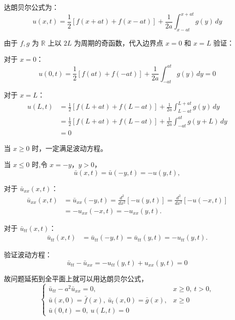 \documentclass[12pt,a4paper]{article}
\numberwithin{subsection}{section}   %
\numberwithin{subsubsection}{subsection}
\theoremstyle{plain}
\theoremstyle{definition}
\theoremstyle{remark}
\theoremstyle{remark}
\begin{document}
达朗贝尔公式为：
\begin{equation}
	u(x,t) = \frac{1}{2} \left[ f(x + at) + f(x - at) \right] + \frac{1}{2a} \int_{x - at}^{x + at} g(y) \, dy
\end{equation}

由于 \(f, g\) 为 \(\mathbb{R}\) 上以 \(2L\) 为周期的奇函数，代入边界点 \(x = 0\) 和 \(x = L\) 验证：

对于 \(x = 0\)：
\begin{equation}
	u(0, t) = \frac{1}{2} \left[ f(at) + f(-at) \right] + \frac{1}{2a} \int_{-at}^{at} g(y) \, dy = 0
\end{equation}

对于 \(x = L\)：
\begin{equation}
	\begin{aligned}
		u(L, t) &= \frac{1}{2}[f(L + at) + f(L - at)] + \frac{1}{2a} \int_{L - at}^{L + at} g(y) \, dy \\
		&= \frac{1}{2}[f(L + at) + f(L - at)] + \frac{1}{2a} \int_{-at}^{at} g(y + L) \, dy \\
		&= 0
	\end{aligned}
\end{equation}

	当 \(x \geq 0\) 时，一定满足波动方程。

当 \(x \leq 0\) 时,令 \(x = -y\)，\(y > 0\)，
\[
\bar{u}(x, t) = \bar{u}(-y, t) = -u(y, t),
\]

对于 \(\bar{u}_{xx}(x, t)\)：
\[
\begin{aligned}
	\bar{u}_{xx}(x, t) &= \bar{u}_{xx}(-y, t) = \frac{d^2}{dx^2} [-u(y, t)] = \frac{d^2}{dx^2} [-u(-x, t)] \\
	&= -u_{xx}(-x, t) = -u_{xx}(y, t).
\end{aligned}
\]

对于 \(\bar{u}_{tt}(x, t)\)：
\[
\begin{aligned}
	\bar{u}_{tt}(x, t) &= \bar{u}_{tt}(-y, t) = \bar{u}_{tt}(y, t) = -u_{tt}(y, t).
\end{aligned}
\]

验证波动方程：
\[
\bar{u}_{tt} - \bar{u}_{xx} = -u_{tt}(y, t) + u_{xx}(y, t) = 0
\]

故问题延拓到全平面上就可以用达朗贝尔公式，
\begin{equation*}
	\begin{cases}
		\bar{u}_{tt} - a^2 \bar{u}_{xx} = 0, & x \geq  0 , \ t > 0, \\
		\bar{u}(x, 0) = \bar{f}(x), \ \bar{u}_t(x, 0) = \bar{g}(x), & x \geq  0 \\
		\bar{u}(0, t) = 0, \ u(L, t) = 0
	\end{cases}
\end{equation*}
\end{document}
